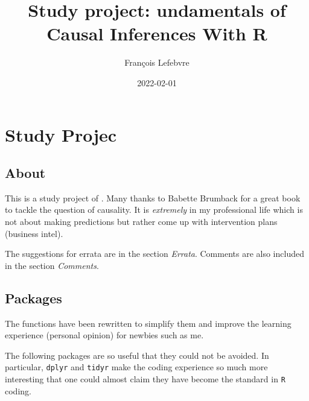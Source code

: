 \documentclass[
]{book}
\title{Study project: undamentals of Causal Inferences With R}
\author{François Lefebvre}
\date{2022-02-01}
\theoremstyle{definition}
\theoremstyle{definition}
\theoremstyle{definition}
\theoremstyle{definition}
\theoremstyle{remark}
\begin{document}
\maketitle

{
\setcounter{tocdepth}{1}
\tableofcontents
}
\hypertarget{study-projec}{%
\chapter*{Study Projec}\label{study-projec}}

\hypertarget{about}{%
\section*{About}\label{about}}

This is a study project of \citet{brumback2022}. Many thanks to Babette Brumback for a
great book to tackle the question of causality. It is \emph{extremely} in my
professional life which is not about making predictions but rather come up
with intervention plans (business intel).

The suggestions for errata are in the section \emph{Errata}. Comments are also
included in the section \emph{Comments}.

\hypertarget{packages}{%
\section*{Packages}\label{packages}}

The functions have been rewritten to simplify them and improve the
learning experience (personal opinion) for newbies such as me.

The following packages are so useful that they
could not be avoided. In particular, \texttt{dplyr} and \texttt{tidyr} make the coding
experience so much more interesting that one could almost claim they have become
the standard in \texttt{R} coding.
\end{document}
